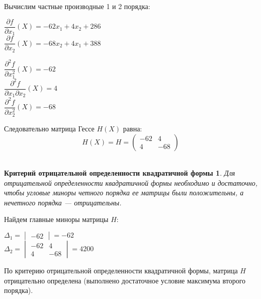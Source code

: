 Вычислим частные производные 1 и 2 порядка:
\begin{multicols}{2}
	\centering
	$\dfrac{\partial f}{\partial x_1} \left(X\right) = -62 x_1 + 4 x_2 + 286$\\
	$\dfrac{\partial f}{\partial x_2} \left(X\right) = -68 x_2 + 4 x_1 + 388$
\end{multicols}

\begin{multicols}{3}
	\centering
	$\dfrac{\partial^2 f}{\partial x_1^2} \left(X\right) = -62$\\
	$\dfrac{\partial^2 f}{\partial x_1 \partial x_2} \left(X\right) = 4$\\
	$\dfrac{\partial^2 f}{\partial x_2^2} \left(X\right) = -68$
\end{multicols}
\vspace{0.3cm}

Следовательно матрица Гессе $H(X)$ равна:
\begin{equation*}
H(X) = H = 
\begin{pmatrix}
	-62 & 4 \\
	4 & -68
\end{pmatrix}
\end{equation*}\\

\newtheorem*{theorem3}{Критерий отрицательной определенности квадратичной формы}
\begin{theorem3}
Для отрицательной определенности квадратичной формы необходимо и достаточно, чтобы угловые миноры четного порядка ее матрицы были положительны, а нечетного порядка — отрицательны.
\end{theorem3}

Найдем главные миноры матрицы $H$:
\begin{multicols}{2}
\centering
$\Delta_1 = \begin{vmatrix} -62 \end{vmatrix} = -62$\\
$\Delta_2 = \begin{vmatrix}
	-62 & 4 \\
	4 & -68
\end{vmatrix} = 4200$
\end{multicols}
По критерию отрицательной определенности квадратичной формы, матрица $H$ отрицательно определена (выполнено достаточное условие максимума второго порядка).

